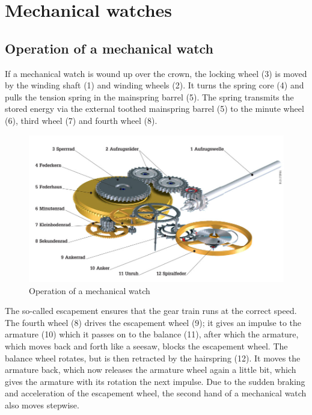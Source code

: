 \documentclass[12pt, a4paper]{report}
\begin{document}
    
    \section{Mechanical watches}  
    \subsection{Operation of a mechanical watch}  
    If a mechanical watch is wound up over the crown, the locking wheel (3) is moved by the winding shaft (1) and winding wheels (2). It turns the spring core (4) and pulls the tension spring in the mainspring barrel (5). The spring transmits the stored energy via the external toothed mainspring barrel (5) to the minute wheel (6), third wheel (7) and fourth wheel (8). 
    \newline
    \noindent
    \begin{figure}[H]
    \centering
    \includegraphics[scale=0.4]{Images/Funktionsweise-Uhrwerk.jpg}
    
    \caption{Operation of a mechanical watch \cite{Uhrwerk}}
    \end{figure}
The so-called escapement ensures that the gear train runs at the correct speed. The fourth wheel (8) drives the escapement wheel (9); it gives an impulse to the armature (10) which it passes on to the balance (11), after which the armature, which moves back and forth like a seesaw, blocks the escapement wheel. The balance wheel rotates, but is then retracted by the hairspring (12). It moves the armature back, which now releases the armature wheel again a little bit, which gives the armature with its rotation the next impulse. Due to the sudden braking and acceleration of the escapement wheel, the second hand of a mechanical watch also moves stepwise. \cite{Uhrwerk}
    \newline
\end{document}
